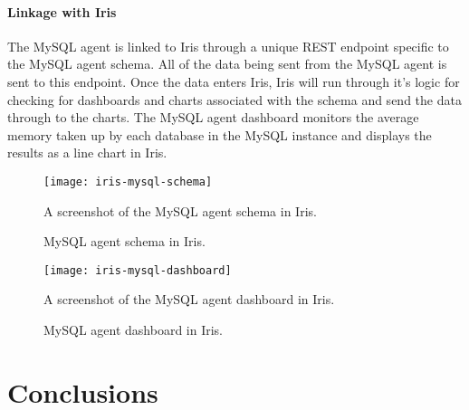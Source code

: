 \documentclass[12pt,a4paper,titlepage]{report}
\begin{document}
\subsubsection{Linkage with Iris}
The MySQL agent is linked to Iris through a unique REST endpoint specific to the MySQL agent schema. All of the data being sent from the MySQL agent is sent to this endpoint. Once the data enters Iris, Iris will run through it's logic for checking for dashboards and charts associated with the schema and send the data through to the charts. 
The MySQL agent dashboard monitors the average memory taken up by each database in the MySQL instance and displays the results as a line chart in Iris.
\begin{figure}[H]
\begin{tcolorbox}
\begin{center}
\texttt{[image: iris-mysql-schema]}
\end{center}
A screenshot of the MySQL agent schema in Iris.
\end{tcolorbox}
\caption{MySQL agent schema in Iris.}
\end{figure}

\begin{figure}[H]
\begin{tcolorbox}
\begin{center}
\texttt{[image: iris-mysql-dashboard]}
\end{center}
A screenshot of the MySQL agent dashboard in Iris.
\end{tcolorbox}
\caption{MySQL agent dashboard in Iris.}
\end{figure}

\chapter{Conclusions}


\nocite{*}
\printbibliography

\clearpage
\end{document}
